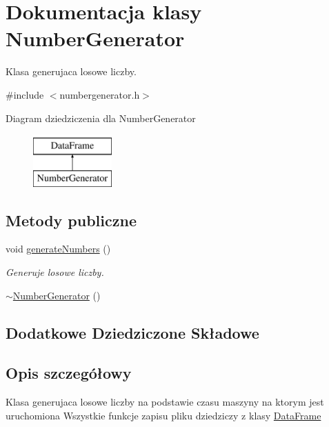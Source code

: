 \hypertarget{class_number_generator}{\section{Dokumentacja klasy Number\-Generator}
\label{class_number_generator}
}


Klasa generujaca losowe liczby.  




{\ttfamily \#include $<$numbergenerator.\-h$>$}

Diagram dziedziczenia dla Number\-Generator\begin{figure}[H]
\begin{center}
\leavevmode
\includegraphics[height=2.000000cm]{class_number_generator}
\end{center}
\end{figure}
\subsection*{Metody publiczne}
\begin{DoxyCompactItemize}
\item 
void \hyperlink{class_number_generator_afe038fce2f1a2c90847fd483beea0494}{generate\-Numbers} ()
\begin{DoxyCompactList}\small\item\em Generuje losowe liczby. \end{DoxyCompactList}\item 
\hyperlink{class_number_generator_a828757cc2c9712e0b111584d1f1d5164}{$\sim$\-Number\-Generator} ()
\end{DoxyCompactItemize}
\subsection*{Dodatkowe Dziedziczone Składowe}


\subsection{Opis szczegółowy}
Klasa generujaca losowe liczby na podstawie czasu maszyny na ktorym jest uruchomiona Wszystkie funkcje zapisu pliku dziedziczy z klasy \hyperlink{class_data_frame}{Data\-Frame} 

